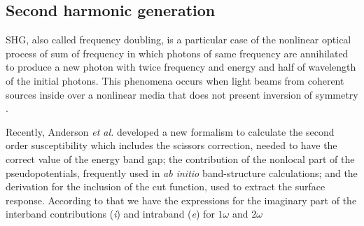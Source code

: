 \documentclass[aps,pra,11pt,tightenlines,showpacs,superscriptaddress,groupedaddress]{revtex4-1}
\begin{document}
    \subsection{Second harmonic generation}

SHG, also called frequency doubling, is a particular case of the nonlinear
optical process of sum of frequency in which photons of same frequency are
annihilated to produce a new photon with twice frequency and energy and half of
wavelength of the initial photons. This phenomena occurs when light beams from
coherent sources inside over a nonlinear media that does not present inversion
of symmetry \cite{bloembergen1962light,anderson2015theory,salazar2014molecular,
sipe2000second}.

Recently, Anderson \emph{et al.} \cite{anderson2015theory} developed a new
formalism to calculate the second order susceptibility which includes the
scissors correction, needed to have the correct value of the energy band gap;
the contribution of the nonlocal part of the pseudopotentials, frequently used
in \emph{ab initio} band-structure calculations; and the derivation for the inclusion
of the cut function, used to extract the surface response. According to that we
have the expressions for the imaginary part of the interband contributions
(\emph{i}) and intraband (\emph{e}) for $1\omega$ and $2\omega$
\end{document}

